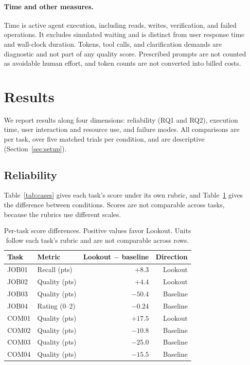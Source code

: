 \documentclass[twocolumn]{article}
\begin{document}
\paragraph{Time and other measures.}
Time is active agent execution, including reads, writes, verification, and failed operations. It excludes simulated waiting and is distinct from user response time and wall-clock duration. Tokens, tool calls, and clarification demands are diagnostic and not part of any quality score. Prescribed prompts are not counted as avoidable human effort, and token counts are not converted into billed costs.

\section{Results}

We report results along four dimensions: reliability (RQ1 and RQ2), execution time, user interaction and resource use, and failure modes. All comparisons are per task, over five matched trials per condition, and are descriptive (Section~\ref{sec:setup}).

\subsection{Reliability}
Table~\ref{tab:cases} gives each task's score under its own rubric, and Table~\ref{tab:deltas} gives the difference between conditions. Scores are not comparable across tasks, because the rubrics use different scales.

\begin{table}[t]
\centering\small
\begin{tabular}{@{}llrr@{}}
\toprule
Task & Metric & Lookout $-$ baseline & Direction \\
\midrule
JOB01 & Recall (pts) & $+8.3$ & Lookout \\
JOB02 & Quality (pts) & $+4.4$ & Lookout \\
JOB03 & Quality (pts) & $-50.4$ & Baseline \\
JOB04 & Rating (0--2) & $-0.24$ & Baseline \\
COM01 & Quality (pts) & $+17.5$ & Lookout \\
COM02 & Quality (pts) & $-10.8$ & Baseline \\
COM03 & Quality (pts) & $-25.0$ & Baseline \\
COM04 & Quality (pts) & $-15.5$ & Baseline \\
\bottomrule
\end{tabular}
\caption{Per-task score differences. Positive values favor Lookout. Units follow each task's rubric and are not comparable across rows.}
\label{tab:deltas}
\end{table}
\end{document}

